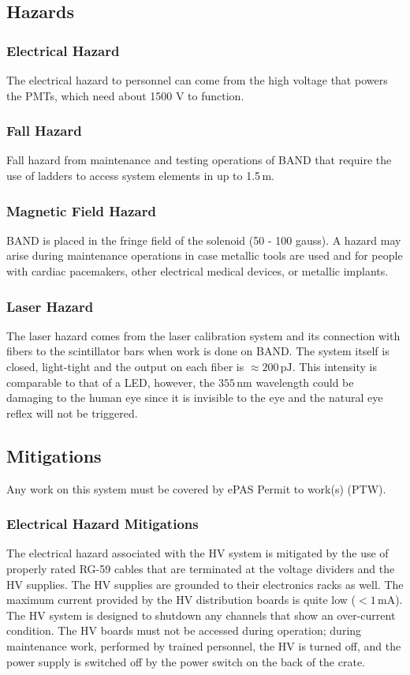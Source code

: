 \subsection{Hazards} 
\indent
\subsubsection{Electrical Hazard}
The electrical hazard to personnel can come from the high voltage that powers the PMTs, which need about 1500 V to function. 

\subsubsection{Fall Hazard}
Fall hazard from maintenance and testing operations of BAND that require the use of ladders to access system elements in up to 1.5\,m. 

\subsubsection{Magnetic Field Hazard}
BAND is placed in the fringe field of the solenoid (50 - 100 gauss). A hazard may arise during maintenance operations in case metallic tools are used and for people with cardiac pacemakers, other electrical medical devices, or metallic implants.

\subsubsection{Laser Hazard}
The laser hazard comes from the laser calibration system and its connection with fibers to the scintillator bars when work is done on BAND. The system itself is closed, light-tight and the output on each fiber is $\approx 200\,\mathrm{pJ}$. This intensity is comparable to that of a LED, however, the $355\,\mathrm{nm}$ wavelength could be damaging to the human eye since it is invisible to the eye and the natural eye reflex will not be triggered. 

\subsection{Mitigations}
Any work on this system must be covered by ePAS Permit to work(s) (PTW).

\indent
\subsubsection{Electrical Hazard Mitigations} 
The electrical hazard associated with the HV system is mitigated by the use of properly rated RG-59 cables that are terminated at the voltage dividers and the HV supplies.
The HV supplies are grounded to their electronics racks as well. 
The maximum current provided by the HV distribution boards is quite low ($<1\,\mathrm{mA}$). The HV system is designed to shutdown any channels that show an over-current condition. The HV boards must not be accessed during operation; during maintenance work, performed by trained personnel, the HV is turned off, and the power supply is switched off by the power switch on the back of the crate.


